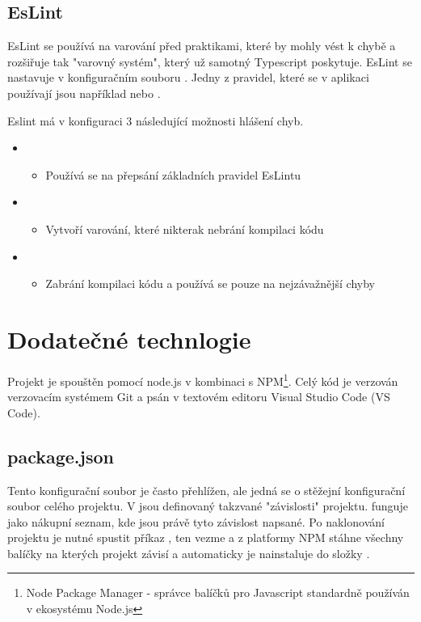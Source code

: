 \subsection{EsLint}
EsLint se používá na varování před praktikami, které by mohly vést k chybě a rozšiřuje tak "varovný systém", který už samotný Typescript poskytuje.
EsLint se nastavuje v konfiguračním souboru . Jedny z pravidel, které se v aplikaci používají jsou například  nebo .

Eslint má v konfiguraci 3 následující možnosti hlášení chyb\cite{eslint}.
\begin{itemize}
    \item {}
    \begin{itemize}
         \item Používá se na přepsání základních pravidel EsLintu
    \end{itemize}
    \item {}
    \begin{itemize}
        \item Vytvoří varování, které nikterak nebrání kompilaci kódu
    \end{itemize}
    \item {}
    \begin{itemize}
        \item Zabrání kompilaci kódu a používá se pouze na nejzávažnější chyby
    \end{itemize}
\end{itemize}


\section{Dodatečné technlogie}
Projekt je spouštěn pomocí node.js v kombinaci s NPM\footnote{Node Package Manager - správce balíčků pro Javascript standardně používán v ekosystému Node.js}. Celý kód je verzován verzovacím systémem Git a psán v textovém editoru Visual Studio Code (VS Code).
\subsection{package.json}
Tento konfigurační soubor je často přehlížen, ale jedná se o stěžejní konfigurační soubor celého projektu. V  jsou definovaný takzvané "závislosti" projektu.  funguje jako nákupní seznam, kde jsou právě tyto závislost napsané. Po naklonování projektu je nutné spustit příkaz , ten vezme  a z platformy NPM\cite{npm} stáhne všechny balíčky na kterých projekt závisí a automaticky je nainstaluje do složky .

